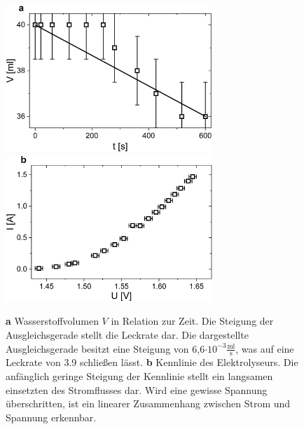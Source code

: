 \documentclass[a4paper,usenatbib]{aspdoc}
\begin{document}
            \begin{figure}
                \centering
                \includegraphics[width=78mm]{graphs/leck1.png}
                \includegraphics[width=78mm]{graphs/elekChar1.png}
                \caption{
                    \textbf{a} Wasserstoffvolumen $V$ in Relation zur Zeit. Die Steigung der Ausgleichsgerade stellt die Leckrate dar. Die dargestellte Ausgleichsgerade besitzt eine Steigung von 6,6$\cdot 10^{-3} \frac{\mathrm{ml}}{\mathrm{s}}$, was auf eine Leckrate von \SI{3,9}{} schließen lässt.
                    \textbf{b} Kennlinie des Elektrolyseurs. Die anfänglich geringe Steigung der Kennlinie stellt ein langsamen einsetzten des Stromflusses dar. Wird eine gewisse Spannung überschritten, ist ein linearer Zusammenhang zwischen Strom und Spannung erkennbar.
                }
                \label{fig:leckRate}
            \end{figure}
            
        
\end{document}
